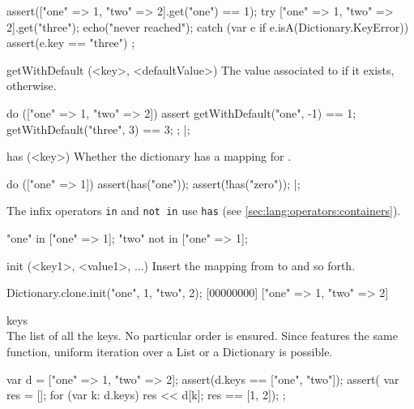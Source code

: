 \begin{urbiscriptapi}
\begin{urbiscript}
assert(["one" => 1, "two" => 2].get("one") == 1);
try
{
  ["one" => 1, "two" => 2].get("three");
  echo("never reached");
}
catch (var e if e.isA(Dictionary.KeyError))
{
  assert(e.key == "three")
};
\end{urbiscript}


\item[getWithDefault](<key>, <defaultValue>)%
  The value associated to  if it exists, 
  otherwise.

\begin{urbiscript}
do (["one" => 1, "two" => 2])
{
  assert
  {
    getWithDefault("one",  -1) == 1;
    getWithDefault("three", 3) == 3;
  };
}|;
\end{urbiscript}


\item[has](<key>)
  Whether the dictionary has a mapping for .

\begin{urbiscript}
do (["one" => 1])
{
  assert(has("one"));
  assert(!has("zero"));
}|;
\end{urbiscript}

  The infix operators \lstinline|in| and \lstinline|not in| use
  \lstinline|has| (see \autoref{sec:lang:operators:containers}).

\begin{urbiassert}
"one" in     ["one" => 1];
"two" not in ["one" => 1];
\end{urbiassert}


\item[init](<key1>, <value1>, ...)%
  Insert the mapping from  to  and so forth.

\begin{urbiscript}
Dictionary.clone.init("one", 1, "two", 2);
[00000000] ["one" => 1, "two" => 2]
\end{urbiscript}


\item[keys]\\
  The list of all the keys.  No particular order is ensured.  Since
   features the same function, uniform iteration over
  a List or a Dictionary is possible.
\begin{urbiscript}
{
  var d = ["one" => 1, "two" => 2];
  assert(d.keys == ["one", "two"]);
  assert({
           var res = [];
           for (var k: d.keys)
             res << d[k];
           res
         }
         == [1, 2]);
};
\end{urbiscript}



\end{urbiscriptapi}
